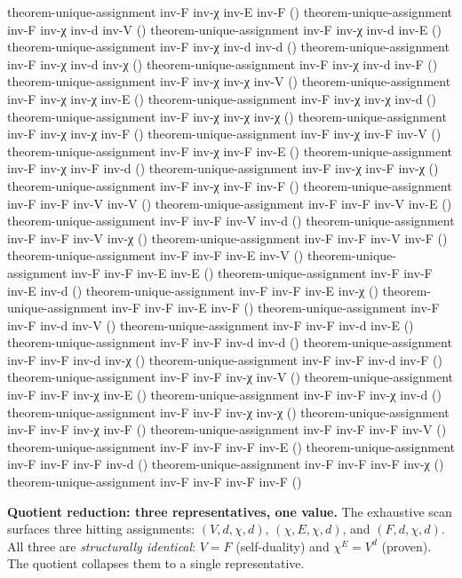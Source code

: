 \documentclass[11pt,a4paper]{article}
\begin{document}
\begin{code}
theorem-unique-assignment inv-F inv-χ inv-E inv-F ()
theorem-unique-assignment inv-F inv-χ inv-d inv-V ()
theorem-unique-assignment inv-F inv-χ inv-d inv-E ()
theorem-unique-assignment inv-F inv-χ inv-d inv-d ()
theorem-unique-assignment inv-F inv-χ inv-d inv-χ ()
theorem-unique-assignment inv-F inv-χ inv-d inv-F ()
theorem-unique-assignment inv-F inv-χ inv-χ inv-V ()
theorem-unique-assignment inv-F inv-χ inv-χ inv-E ()
theorem-unique-assignment inv-F inv-χ inv-χ inv-d ()
theorem-unique-assignment inv-F inv-χ inv-χ inv-χ ()
theorem-unique-assignment inv-F inv-χ inv-χ inv-F ()
theorem-unique-assignment inv-F inv-χ inv-F inv-V ()
theorem-unique-assignment inv-F inv-χ inv-F inv-E ()
theorem-unique-assignment inv-F inv-χ inv-F inv-d ()
theorem-unique-assignment inv-F inv-χ inv-F inv-χ ()
theorem-unique-assignment inv-F inv-χ inv-F inv-F ()
theorem-unique-assignment inv-F inv-F inv-V inv-V ()
theorem-unique-assignment inv-F inv-F inv-V inv-E ()
theorem-unique-assignment inv-F inv-F inv-V inv-d ()
theorem-unique-assignment inv-F inv-F inv-V inv-χ ()
theorem-unique-assignment inv-F inv-F inv-V inv-F ()
theorem-unique-assignment inv-F inv-F inv-E inv-V ()
theorem-unique-assignment inv-F inv-F inv-E inv-E ()
theorem-unique-assignment inv-F inv-F inv-E inv-d ()
theorem-unique-assignment inv-F inv-F inv-E inv-χ ()
theorem-unique-assignment inv-F inv-F inv-E inv-F ()
theorem-unique-assignment inv-F inv-F inv-d inv-V ()
theorem-unique-assignment inv-F inv-F inv-d inv-E ()
theorem-unique-assignment inv-F inv-F inv-d inv-d ()
theorem-unique-assignment inv-F inv-F inv-d inv-χ ()
theorem-unique-assignment inv-F inv-F inv-d inv-F ()
theorem-unique-assignment inv-F inv-F inv-χ inv-V ()
theorem-unique-assignment inv-F inv-F inv-χ inv-E ()
theorem-unique-assignment inv-F inv-F inv-χ inv-d ()
theorem-unique-assignment inv-F inv-F inv-χ inv-χ ()
theorem-unique-assignment inv-F inv-F inv-χ inv-F ()
theorem-unique-assignment inv-F inv-F inv-F inv-V ()
theorem-unique-assignment inv-F inv-F inv-F inv-E ()
theorem-unique-assignment inv-F inv-F inv-F inv-d ()
theorem-unique-assignment inv-F inv-F inv-F inv-χ ()
theorem-unique-assignment inv-F inv-F inv-F inv-F ()
\end{code}

\textbf{Quotient reduction: three representatives, one value.}
The exhaustive scan surfaces three hitting assignments:
$(V,d,\chi,d)$, $(\chi,E,\chi,d)$, and $(F,d,\chi,d)$.
All three are \emph{structurally identical}: $V = F$ (self-duality)
and $\chi^E = V^d$ (proven). The quotient collapses them to a single
representative.
\end{document}
